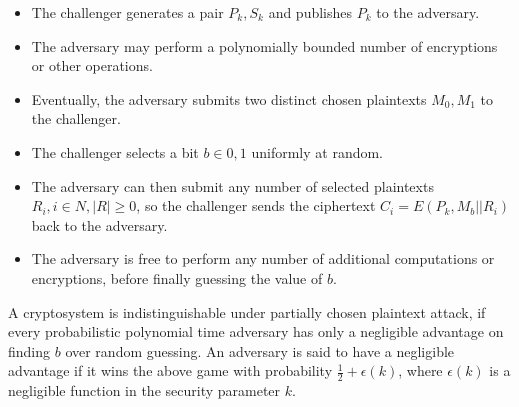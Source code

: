 \begin{itemize}
\item The challenger generates a pair \begin{math}P_k, S_k\end{math} and publishes \begin{math}P_k\end{math} to the adversary.
\item The adversary may perform a polynomially bounded number of encryptions or other operations.
\item Eventually, the adversary submits two distinct chosen plaintexts \begin{math}M_0, M_1\end{math} to the challenger.
\item The challenger selects a bit \begin{math}b\in{0, 1}\end{math} uniformly at random.
\item The adversary can then submit any number of selected plaintexts \begin{math}R_i, i\in N, |R| \geq 0\end{math}, so the challenger sends the ciphertext \begin{math}C_i = E(P_k, M_b||R_i)\end{math} back to the adversary.
\item The adversary is free to perform any number of additional computations or encryptions, before finally guessing the value of \begin{math}b\end{math}.
\end{itemize}

A cryptosystem is indistinguishable under partially chosen plaintext attack, if every probabilistic polynomial time adversary has only a negligible advantage on finding \begin{math}b\end{math} over random guessing. An adversary is said to have a negligible advantage if it wins the above game with probability \begin{math}\frac{1}{2} + \epsilon(k)\end{math}, where \begin{math}\epsilon(k)\end{math} is a negligible function in the security parameter \begin{math}k\end{math}.


